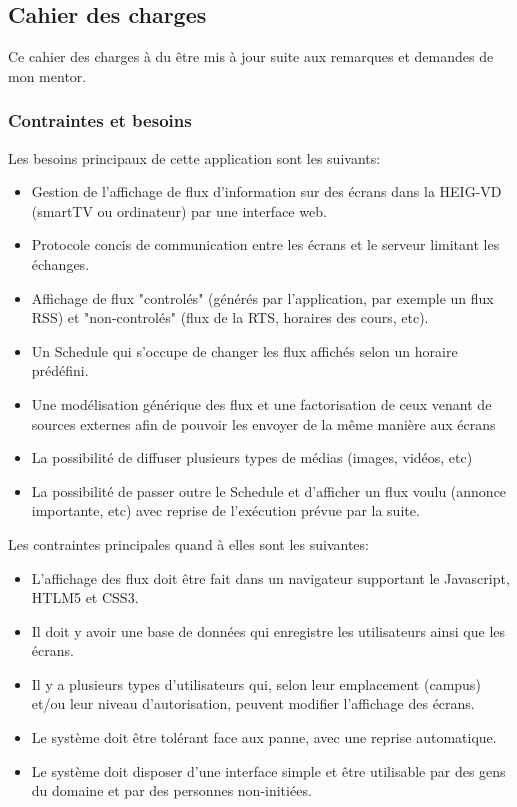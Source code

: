 \documentclass[french]{article}
\begin{document}
\newpage
\begin{appendices}
\chapter{}
\section{Cahier des charges}

Ce cahier des charges à du être mis à jour suite aux remarques et demandes de mon mentor.

\subsection{Contraintes et besoins}
Les besoins principaux de cette application sont les suivants:
\begin{itemize}
	\item Gestion de l'affichage de flux d'information sur des écrans dans la HEIG-VD (smartTV ou ordinateur) par une interface web.
	\item Protocole concis de communication entre les écrans et le serveur limitant les échanges.
	\item Affichage de flux "controlés" (générés par l'application, par exemple un flux RSS) et "non-controlés" (flux de la RTS, horaires des cours, etc).
	\item Un Schedule qui s'occupe de changer les flux affichés selon un horaire prédéfini.
	\item Une modélisation générique des flux et une factorisation de ceux venant de sources externes afin de pouvoir les envoyer de la même manière aux écrans
	\item La possibilité de diffuser plusieurs types de médias (images, vidéos, etc)
	\item La possibilité de passer outre le Schedule et d'afficher un flux voulu (annonce importante, etc) avec reprise de l'exécution prévue par la suite. \newline
\end{itemize}


Les contraintes principales quand à elles sont les suivantes:
\begin{itemize}
	\item L'affichage des flux doit être fait dans un navigateur supportant le Javascript, HTLM5 et CSS3.
	\item Il doit y avoir une base de données qui enregistre les utilisateurs ainsi que les écrans.
	\item Il y a plusieurs types d'utilisateurs qui, selon leur emplacement (campus) et/ou leur niveau d'autorisation, peuvent modifier l'affichage des écrans.
	\item Le système doit être tolérant face aux panne, avec une reprise automatique.
	\item Le système doit disposer d'une interface simple et être utilisable par des gens du domaine et par des personnes non-initiées.
\end{itemize}



\end{appendices}
\end{document}
